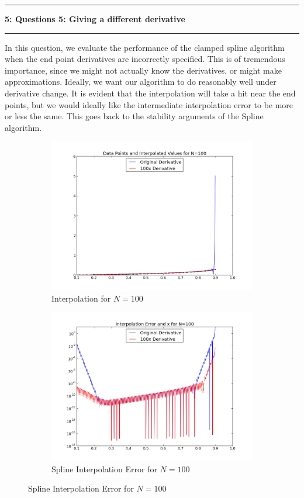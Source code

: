 \documentclass[11pt]{article}
\newcommand\question[2]{\vspace{.25in}\hrule\textbf{#1: #2}\vspace{.5em}\hrule\vspace{.10in}}
\begin{document}
\question{5}{Questions 5: Giving a different derivative } 
\setcounter{section}{5}

In this question, we evaluate the performance of the clamped spline algorithm when the end point derivatives are incorrectly specified. This is of tremendous importance, since we might not actually know the derivatives, or might make approximations. Ideally, we want our algorithm to do reasonably well under derivative change. It is evident that the interpolation will take a hit near the end points, but we would ideally like the intermediate interpolation error to be more or less the same. This goes back to the stability arguments of the Spline algorithm. 


\begin{figure}[h]
        \centering
        \begin{subfigure}{.5\textwidth}
  \centering
        \includegraphics[width=\linewidth]{q5/func_comp.png}
                \caption{Interpolation for $N=100$}
                \label{fig:q5_func_comp}
                \end{subfigure}%
\begin{subfigure}{.5\textwidth}
  \centering
        \includegraphics[width=\linewidth]{q5/err_comp.png}
                \caption{Spline Interpolation Error for $N=100$}
                \label{fig:q5_err_comp}
	\end{subfigure}
            

\end{figure}
\end{document}
